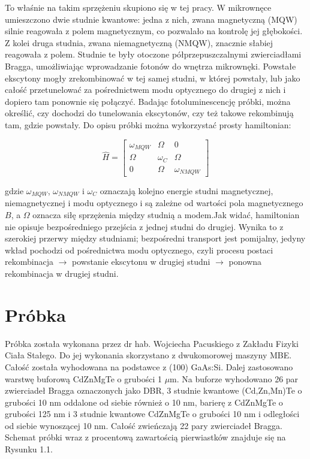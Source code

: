 \documentclass[licencjacka]{pracamgr}
\begin{document}
 To właśnie na takim sprzężeniu skupiono się w tej pracy. W mikrownęce umieszczono dwie studnie kwantowe: jedna z nich, zwana magnetyczną (MQW) silnie reagowała z polem magnetycznym, co pozwalało na kontrolę jej głębokości. Z kolei druga studnia, zwana niemagnetyczną (NMQW), znacznie słabiej reagowała z polem. Studnie te były otoczone półprzepuszczalnymi zwierciadłami Bragga, umożliwiając wprowadzanie fotonów do wnętrza mikrownęki. Powstałe ekscytony mogły zrekombinować w tej samej studni, w której powstały, lub jako całość przetunelować za pośrednictwem modu optycznego do drugiej z nich i dopiero tam ponownie się połączyć. Badając fotoluminescencję próbki, można określić, czy dochodzi do tunelowania ekscytonów, czy też takowe rekombinują tam, gdzie powstały. Do opisu próbki można wykorzystać prosty hamiltonian:

\begin{equation}
\hat{H}=
\begin{bmatrix}
\omega_{MQW} & \Omega &0 \\
\Omega & \omega_{C} & \Omega \\
0 & \Omega & \omega_{NMQW}
\end{bmatrix}  
\end{equation}

gdzie $\omega_{MQW}$, $\omega_{NMQW}$ i $\omega_{C}$ oznaczają kolejno energie studni magnetycznej, niemagnetycznej i modu optycznego i są zależne od wartości pola magnetycznego $B$, a $\Omega$ oznacza siłę sprzężenia między studnią a modem.Jak widać, hamiltonian nie opisuje bezpośredniego przejścia z jednej studni do drugiej. Wynika to z szerokiej przerwy między studniami; bezpośredni transport jest pomijalny, jedyny wkład pochodzi od pośrednictwa modu optycznego, czyli procesu postaci rekombinacja $\rightarrow$ powstanie ekscytonu w drugiej studni $\rightarrow$ ponowna rekombinacja w drugiej studni.%

\chapter{Próbka}\label{r:probka}
Próbka została wykonana przez dr hab. Wojciecha Pacuskiego z Zakładu Fizyki Ciała Stałego. Do jej wykonania skorzystano z dwukomorowej maszyny MBE. Całość została wyhodowana na podstawce z (100) GaAs:Si. Dalej zastosowano warstwę buforową CdZnMgTe o grubości 1 $\mu$m. Na buforze wyhodowano 26 par zwierciadeł Bragga oznaczonych jako DBR, 3 studnie kwantowe (Cd,Zn,Mn)Te o grubości 10 nm oddalone od siebie również o 10 nm, barierę z CdZnMgTe o grubości 125 nm i 3 studnie kwantowe CdZnMgTe o grubości 10 nm i odległości od siebie wynoszącej 10 nm. Całość zwieńczają 22 pary zwierciadeł Bragga. Schemat próbki wraz z procentową zawartością pierwiastków znajduje się na Rysunku 1.1.
\end{document}
